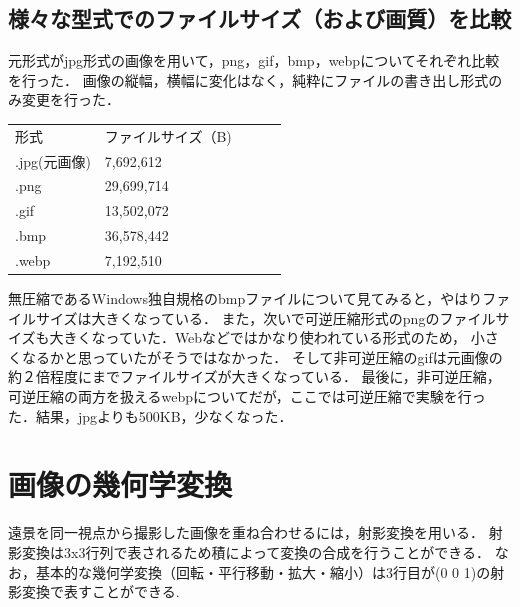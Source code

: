 \documentclass[11pt]{jarticle}
\begin{document}
\subsection{様々な型式でのファイルサイズ（および画質）を比較}

元形式がjpg形式の画像を用いて，png，gif，bmp，webpについてそれぞれ比較を行った．
画像の縦幅，横幅に変化はなく，純粋にファイルの書き出し形式のみ変更を行った．
\begin{table}[h]
    \begin{center}
    \begin{tabular}{l|llll}
    \cline{1-2}
    形式        & ファイルサイズ（B) &  &  &  \\ \cline{1-2}
    .jpg(元画像) & 7,692,612  &  &  &  \\
    .png      & 29,699,714 &  &  &  \\
    .gif      & 13,502,072 &  &  &  \\
    .bmp      & 36,578,442 &  &  &  \\
    .webp     & 7,192,510  &  &  &  \\ \cline{1-2}
    \end{tabular}
\end{center}
\end{table}

無圧縮であるWindows独自規格のbmpファイルについて見てみると，やはりファイルサイズは大きくなっている．
また，次いで可逆圧縮形式のpngのファイルサイズも大きくなっていた．Webなどではかなり使われている形式のため，
小さくなるかと思っていたがそうではなかった．
そして非可逆圧縮のgifは元画像の約２倍程度にまでファイルサイズが大きくなっている．
最後に，非可逆圧縮，可逆圧縮の両方を扱えるwebpについてだが，ここでは可逆圧縮で実験を行った．結果，jpgよりも500KB，少なくなった．

\section{画像の幾何学変換}

遠景を同一視点から撮影した画像を重ね合わせるには，射影変換を用いる．
射影変換は3x3行列で表されるため積によって変換の合成を行うことができる． なお，基本的な幾何学変換（回転・平行移動・拡大・縮小）は3行目が(0 0 1)の射影変換で表すことができる.
\end{document}
